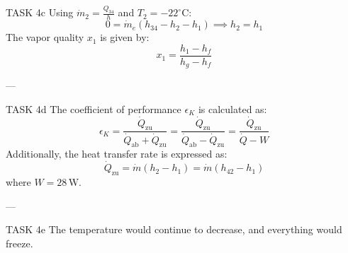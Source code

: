 TASK 4c  
Using \( \dot{m}_2 = \frac{Q_{34}}{h} \) and \( T_2 = -22^\circ\text{C} \):  
\[
0 = \dot{m}_e \left( h_{34} - h_2 - h_1 \right) \implies h_2 = h_1
\]  
The vapor quality \( x_1 \) is given by:  
\[
x_1 = \frac{h_1 - h_f}{h_g - h_f}
\]  

---

TASK 4d  
The coefficient of performance \( \epsilon_K \) is calculated as:  
\[
\epsilon_K = \frac{\dot{Q}_{\text{zu}}}{\dot{Q}_{\text{ab}} + \dot{Q}_{\text{zu}}} = \frac{\dot{Q}_{\text{zu}}}{\dot{Q}_{\text{ab}} - \dot{Q}_{\text{zu}}} = \frac{\dot{Q}_{\text{zu}}}{\dot{Q} - W}
\]  
Additionally, the heat transfer rate is expressed as:  
\[
\dot{Q}_{\text{zu}} = \dot{m} \left( h_2 - h_1 \right) = \dot{m} \left( h_{42} - h_1 \right)
\]  
where \( W = 28 \, \text{W} \).  

---

TASK 4e  
The temperature would continue to decrease, and everything would freeze.